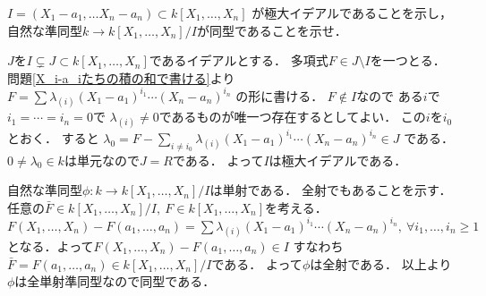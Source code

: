 \begin{prob}
  $I = (X_1-a_1, \dots X_n-a_n) \subset k[X_1,\dots,X_n]$
  が極大イデアルであることを示し，
  自然な準同型$k\to k[X_1,\dots,X_n]/I$が同型であることを示せ．
\end{prob}
\begin{ans}
  $J$を$I \subsetneq J \subset k[X_1,\dots,X_n]$であるイデアルとする．
  多項式$ F \in J \setminus I$を一つとる．
  問題\ref{X_i-a_iたちの積の和で書ける}より
  $F = \sum \lambda_{(i)} (X_1 - a_1)^{i_1} \cdots (X_n - a_n)^{i_n}$
  の形に書ける．
  $F \not\in I$なので
  ある$i$で$i_1 = \cdots = i_n = 0$で
  $\lambda_{(i)} \ne 0$であるものが唯一つ存在するとしてよい．
  この$i$を$i_0$とおく．
  すると
  $\lambda_0 = F - \sum_{i \ne i_0} \lambda_{(i)} (X_1 - a_1)^{i_1} \cdots (X_n - a_n)^{i_n} \in J$
  である．
  $0 \ne \lambda_0 \in k$は単元なので$J = R$である．
  よって$I$は極大イデアルである．

  自然な準同型$\phi : k\to k[X_1,\dots,X_n]/I$は単射である．
  全射でもあることを示す．
  任意の$\bar{F} \in k[X_1,\dots,X_n]/I, \ F \in k[X_1,\dots,X_n]$を考える．
  $F(X_1,\dots,X_n) - F(a_1, \dots, a_n) = \sum \lambda_{(i)} (X_1 - a_1)^{i_1} \cdots (X_n - a_n)^{i_n}, \ 
  \forall i_1, \dots, i_n \ge 1$
  となる．よって$F(X_1,\dots,X_n) - F(a_1, \dots, a_n) \in I$
  すなわち$\bar{F} = F(a_1, \dots, a_n) \in k[X_1,\dots,X_n]/I$である．
  よって$\phi$は全射である．
  以上より$\phi$は全単射準同型なので同型である．
\end{ans}

